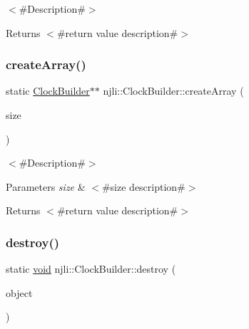 $<$\#\+Description\#$>$

\begin{DoxyReturn}{Returns}
$<$\#return value description\#$>$ 
\end{DoxyReturn}
\mbox{\label{classnjli_1_1_clock_builder_aae2ec15a97eb44ff4ff88deb9044a62c}} 
\subsubsection{\texorpdfstring{create\+Array()}{createArray()}}
{\footnotesize\ttfamily static \mbox{\hyperlink{classnjli_1_1_clock_builder}{Clock\+Builder}}$\ast$$\ast$ njli\+::\+Clock\+Builder\+::create\+Array (\begin{DoxyParamCaption}\item[{const \mbox{\hyperlink{_util_8h_a10e94b422ef0c20dcdec20d31a1f5049}{u32}}}]{size }\end{DoxyParamCaption})\hspace{0.3cm}{\ttfamily [static]}}

$<$\#\+Description\#$>$


\begin{DoxyParams}{Parameters}
{\em size} & $<$\#size description\#$>$\\
\hline
\end{DoxyParams}
\begin{DoxyReturn}{Returns}
$<$\#return value description\#$>$ 
\end{DoxyReturn}
\mbox{\label{classnjli_1_1_clock_builder_a8120396fc0e83b5df09572393e3cd88f}} 
\subsubsection{\texorpdfstring{destroy()}{destroy()}}
{\footnotesize\ttfamily static \mbox{\hyperlink{_thread_8h_af1e856da2e658414cb2456cb6f7ebc66}{void}} njli\+::\+Clock\+Builder\+::destroy (\begin{DoxyParamCaption}\item[{\mbox{\hyperlink{classnjli_1_1_clock_builder}{Clock\+Builder}} $\ast$}]{object }\end{DoxyParamCaption})\hspace{0.3cm}{\ttfamily [static]}}

